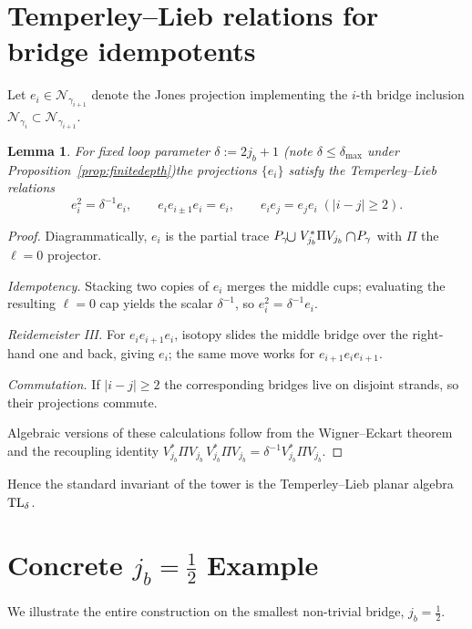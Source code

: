 \documentclass[11pt]{article}
\newtheorem{lemma}{Lemma}[section]
\begin{document}
\appendix
\section{Temperley--Lieb relations for bridge idempotents}\label{app:TL}

Let $e_i\in\mathcal N_{\gamma_{i+1}}$ denote the Jones projection 
implementing the $i$-th bridge inclusion 
$\mathcal N_{\gamma_i}\subset\mathcal N_{\gamma_{i+1}}$.

\begin{lemma}
For fixed loop parameter $\delta := 2j_b+1$ (note $\delta\le\delta_{\max}$ under Proposition~\ref{prop:finitedepth})\;the projections $\{e_i\}$
satisfy the Temperley--Lieb relations
\[
  e_i^2 = \delta^{-1} e_i,\qquad
  e_i e_{i\pm1} e_i = e_i,\qquad
  e_i e_j = e_j e_i\;( |i-j|\ge 2).
\]
\end{lemma}

\begin{proof}
Diagrammatically, $e_i$ is the partial trace
\(
  \smash{P_\gamma\!\mathbin{\raisebox{-0.3ex}{\scalebox{1.2}{$\cup$}}}}
  \;V_{j_b}^{*}\Pi V_{j_b}
  \mathbin{\raisebox{-0.3ex}{\scalebox{1.2}{$\cap$}}}\!P_\gamma
\)
with $\Pi$ the $\ell=0$ projector.  

\emph{Idempotency.}  
Stacking two copies of $e_i$ merges the middle cups; 
evaluating the resulting $\ell=0$ cap yields the scalar $\delta^{-1}$, 
so $e_i^2=\delta^{-1}e_i$.

\emph{Reidemeister III.}  
For $e_ie_{i+1}e_i$, isotopy slides the middle bridge over the right‐hand one
and back, giving $e_i$; the same move works for $e_{i+1}e_ie_{i+1}$.

\emph{Commutation.}  
If $|i-j|\ge2$ the corresponding bridges live on disjoint strands, so their
projections commute.

Algebraic versions of these calculations follow from the 
Wigner--Eckart theorem and the recoupling identity 
$V_{j_b}^{*}\Pi V_{j_b}\,V_{j_b}^{*}\Pi V_{j_b}= \delta^{-1} V_{j_b}^{*}\Pi V_{j_b}$.
\end{proof}

Hence the standard invariant of the tower is the Temperley--Lieb
planar algebra ${\rm TL}_\delta$.

\appendix
\section{Concrete $j_b=\tfrac12$ Example}\label{app:example}

We illustrate the entire construction on the smallest non-trivial bridge,
$j_b=\tfrac12$.
\end{document}
